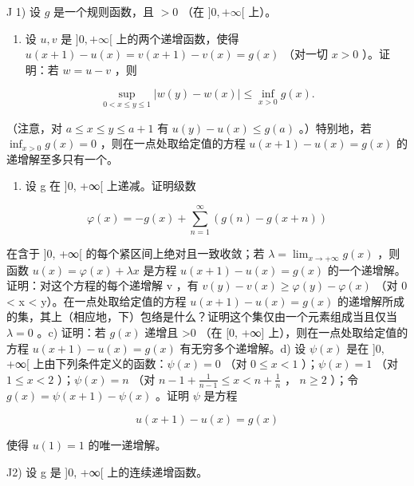 J 1) 设 \(g\) 是一个规则函数，且 \(>0\) （在 \(]0, +\infty[\) 上）。

\begin{enumerate}
\def\labelenumi{\alph{enumi})}
\tightlist
\item
  设 \(u, v\) 是 \(]0, +\infty[\) 上的两个递增函数，使得 \(u(x + 1) - u(x) = v(x + 1) - v(x) = g(x)\) （对一切 \(x > 0\) ）。证明：若 \(w = u - v\) ，则
\end{enumerate}

\[
\sup _ {0 <   x \leqslant y \leqslant 1} | w (y) - w (x) | \leqslant \inf _ {x > 0} g (x).
\]

（注意，对 \(a \leqslant x \leqslant y \leqslant a + 1\) 有 \(u(y) - u(x) \leqslant g(a)\) 。）特别地，若 \(\inf_{x > 0} g(x) = 0\) ，则在一点处取给定值的方程 \(u(x + 1) - u(x) = g(x)\) 的递增解至多只有一个。

\begin{enumerate}
\def\labelenumi{\alph{enumi})}
\setcounter{enumi}{1}
\tightlist
\item
  设 g 在 {]}0, +∞{[} 上递减。证明级数
\end{enumerate}

\[
\varphi (x) = - g (x) + \sum_ {n = 1} ^ {\infty} (g (n) - g (x + n))
\]

在含于 {]}0, +∞{[} 的每个紧区间上绝对且一致收敛；若 \(\lambda = \lim_{x \to +\infty} g(x)\) ，则函数 \(u(x) = \varphi(x) + \lambda x\) 是方程 \(u(x+1) - u(x) = g(x)\) 的一个递增解。证明：对这个方程的每个递增解 v ，有 \(v(y) - v(x) \geqslant \varphi(y) - \varphi(x)\) （对 0 \textless{} x \textless{} y）。在一点处取给定值的方程 \(u(x+1) - u(x) = g(x)\) 的递增解所成的集，其上（相应地，下）包络是什么？证明这个集仅由一个元素组成当且仅当 \(\lambda = 0\) 。c) 证明：若 \(g(x)\) 递增且 \textgreater0 （在 {[}0, +∞{]} 上），则在一点处取给定值的方程 \(u(x+1) - u(x) = g(x)\) 有无穷多个递增解。d) 设 \(\psi(x)\) 是在 {]}0, +∞{[} 上由下列条件定义的函数：\(\psi(x)=0\) （对 \(0\leqslant x<1\) ）；\(\psi(x)=1\) （对 \(1\leqslant x<2\) ）；\(\psi(x)=n\) （对 \(n-1+\frac{1}{n-1}\leqslant x<n+\frac{1}{n}\) ， \(n\geqslant2\) ）；令 \(g(x)=\psi(x+1)-\psi(x)\) 。证明 \(\psi\) 是方程

\[
u (x + 1) - u (x) = g (x)
\]

使得 \(u(1)=1\) 的唯一递增解。

J2) 设 g 是 {]}0, +∞{[} 上的连续递增函数。

